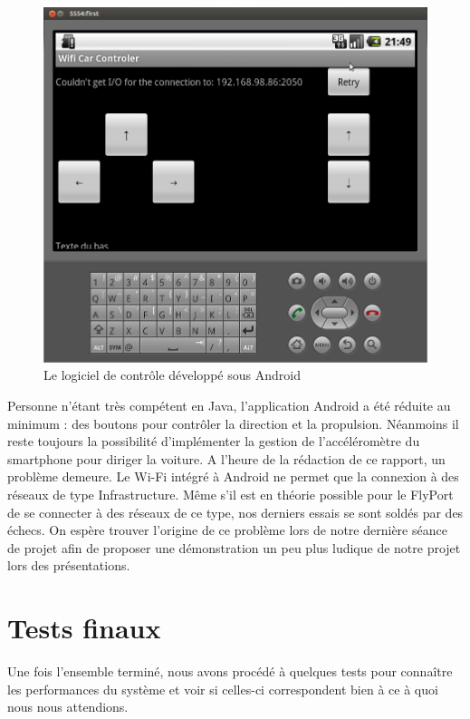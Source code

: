 \documentclass[a4paper,12pt]{report}
\begin{document}
\begin{figure}[!h]
	\begin{center}
		\includegraphics[scale=0.4]{images/logicielandroid.png}
	\end{center}
	\caption{Le logiciel de contrôle développé sous Android} 
	\label{logicielandroid}
\end{figure}

			Personne n’étant très compétent en Java, l'application Android a été réduite au minimum : des boutons pour contrôler la direction et la propulsion. Néanmoins il reste toujours la possibilité d’implémenter la gestion de l'accéléromètre du smartphone pour diriger la voiture.
A l’heure de la rédaction de ce rapport, un problème demeure. Le Wi-Fi intégré à Android ne permet que la connexion à des réseaux de type Infrastructure. Même s’il est en théorie possible pour le FlyPort de se connecter à des réseaux de ce type, nos derniers essais se sont soldés par des échecs. On espère trouver l’origine de ce problème lors de notre dernière séance de projet afin de proposer une démonstration un peu plus ludique de notre projet lors des présentations.

	\section{Tests finaux}
	Une fois l’ensemble terminé, nous avons procédé à quelques tests pour connaître les performances du système et voir si celles-ci correspondent bien à ce à quoi nous nous attendions.
	
\end{document}
